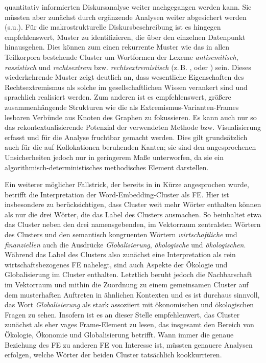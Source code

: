 quantitativ informierten Diskursanalyse \autocite{bubenhoferQuantitativInformierteQualitative2013} weiter nachgegangen werden kann. Sie müssten aber zunächst durch ergänzende Analysen weiter abgesichert werden (s.u.). Für die makrostrukturelle Diskursbeschreibung ist es hingegen empfehlenswert, Muster zu identifizieren, die über den einzelnen Datenpunkt hinausgehen. Dies können zum einen rekurrente Muster wie das in allen Teilkorpora bestehende Cluster um Wortformen der Lexeme \emph{antisemitisch}, \emph{rassistisch} und \emph{rechtsextrem} bzw. \emph{rechtsextremistisch} (z.\,B. ,  oder ) sein. Dieses wiederkehrende Muster zeigt deutlich an, dass wesentliche Eigenschaften des Rechtsextremismus als solche im gesellschaftlichen Wissen verankert sind und sprachlich realisiert werden. Zum anderen ist es empfehlenswert, größere zusammenhängende Strukturen wie die als Extremismus-Varianten-Frames lesbaren Verbünde aus Knoten des Graphen zu fokussieren. Es kann auch nur so das rekontextualisierende Potenzial \autocite{bubenhoferVisuelleLinguistikZur2020} der verwendeten Methode bzw. Visualisierung erfasst und für die Analyse fruchtbar gemacht werden. Dies gilt grundsätzlich auch für die auf Kollokationen beruhenden Kanten; sie sind den angesprochenen Unsicherheiten jedoch nur in geringerem Maße unterworfen, da sie ein algorithmisch-deterministisches methodisches Element darstellen.

Ein weiterer möglicher Fallstrick, der bereits in  in Kürze angesprochen wurde, betrifft die Interpretation der Word-Embedding-Cluster als FE. Hier ist insbesondere zu berücksichtigen, dass Cluster weit mehr Wörter enthalten können als nur die drei Wörter, die das Label des Clusters ausmachen. So beinhaltet etwa das Cluster  neben den drei namensgebenden, im Vektorraum zentralsten Wörtern des Clusters und den semantisch kongruenten Wörtern \emph{wirtschaftliche} und \emph{finanziellen} auch die Ausdrücke \emph{Globalisierung}, \emph{ökologische} und \emph{ökologischen}. Während das Label des Clusters also zunächst eine Interpretation als rein wirtschaftsbezogenes FE nahelegt, sind auch Aspekte der Ökologie und Globalisierung im Cluster enthalten. Letztlich beruht jedoch die Nachbarschaft im Vektorraum und mithin die Zuordnung zu einem gemeinsamen Cluster auf dem musterhaften Auftreten in ähnlichen Kontexten und es ist durchaus sinnvoll, das Wort \emph{Globalisierung} als stark assoziiert mit ökonomischen und ökologischen Fragen zu sehen. Insofern ist es an dieser Stelle empfehlenwert, das Cluster zunächst als eher vages Frame-Element zu lesen, das insgesamt den Bereich von Ökologie, Ökonomie und Globalisierung betrifft. Wann immer die genaue Beziehung des FE zu anderen FE von Interesse ist, müssten genauere Analysen erfolgen, welche Wörter der beiden Cluster tatsächlich kookkurrieren.

